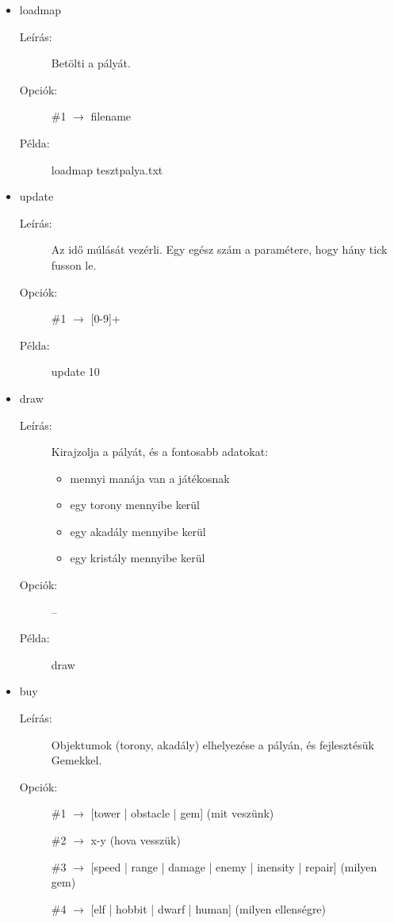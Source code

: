 \begin{itemize}
\item loadmap
	\begin{description}
	\item[Leírás:] Betölti a pályát.
	\item[Opciók:] \#1 $\rightarrow$ filename
	\item[Példa:] loadmap tesztpalya.txt
	\end{description}

\item update
	\begin{description}
	\item[Leírás:] 	Az idő múlását vezérli. Egy egész szám a paramétere, hogy hány tick fusson le.
	\item[Opciók:] \#1 $\rightarrow$ [0-9]+
	\item[Példa:] update 10 
	\end{description}

\item draw
	\begin{description}
	\item[Leírás:] Kirajzolja a pályát, és a fontosabb adatokat: 
	\begin{itemize}
	\item mennyi manája van a játékosnak
	\item egy torony mennyibe kerül
	\item egy akadály mennyibe kerül
	\item egy kristály mennyibe kerül
	\end{itemize}
	\item[Opciók:] --
	\item[Példa:] draw
	\end{description}

\item buy 
	\begin{description}
	\item[Leírás:] 	Objektumok (torony, akadály) elhelyezése a pályán, és fejlesztésük Gemekkel.
	\item[Opciók:] 
	
	\#1 $\rightarrow$ [tower | obstacle | gem] 					(mit veszünk)
	
	\#2 $\rightarrow$ x-y 								(hova vesszük)
	
	\#3 $\rightarrow$ [speed | range | damage | enemy | inensity | repair]		(milyen gem)
	
	\#4 $\rightarrow$ [elf | hobbit | dwarf | human]					(milyen ellenségre)
	

\end{description}
\end{itemize}

